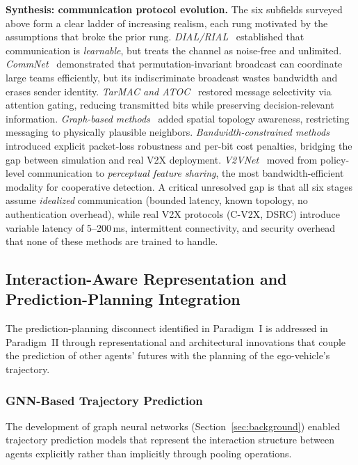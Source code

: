 \documentclass[12pt, a4paper]{article}
\begin{document}
\smallskip\noindent\textbf{Synthesis: communication protocol evolution.}
The six subfields surveyed above form a clear ladder of increasing realism,
each rung motivated by the assumptions that broke the prior rung.
\emph{DIAL/RIAL}~\cite{foerster2016learning} established that communication
is \emph{learnable}, but treats the channel as noise-free and unlimited.
\emph{CommNet}~\cite{sukhbaatar2016learning} demonstrated that
permutation-invariant broadcast can coordinate large teams efficiently,
but its indiscriminate broadcast wastes bandwidth and erases sender identity.
\emph{TarMAC and ATOC}~\cite{das2019tarmac,jiang2018learning} restored
message selectivity via attention gating, reducing transmitted bits while
preserving decision-relevant information.
\emph{Graph-based methods}~\cite{jiang2019graph,kim2019learning} added
spatial topology awareness, restricting messaging to physically plausible
neighbors.
\emph{Bandwidth-constrained methods}~\cite{kim2019message,wang2020bandwidth}
introduced explicit packet-loss robustness and per-bit cost penalties,
bridging the gap between simulation and real V2X deployment.
\emph{V2VNet}~\cite{wang2020v2vnet} moved from policy-level communication
to \emph{perceptual feature sharing}, the most bandwidth-efficient modality
for cooperative detection.
A critical unresolved gap is that all six stages assume
\emph{idealized} communication (bounded latency, known topology, no
authentication overhead), while real V2X protocols (C-V2X, DSRC) introduce
variable latency of 5--200\,ms, intermittent connectivity, and security
overhead that none of these methods are trained to handle.

\subsection{Interaction-Aware Representation and Prediction-Planning Integration}
\label{sec:representation}

The prediction-planning disconnect identified in Paradigm~I is addressed in
Paradigm~II through representational and architectural innovations that
couple the prediction of other agents' futures with the planning of the
ego-vehicle's trajectory.

\subsubsection{GNN-Based Trajectory Prediction}

The development of graph neural networks (Section~\ref{sec:background})
enabled trajectory prediction models that represent the interaction structure
between agents explicitly rather than implicitly through pooling operations.
\end{document}
